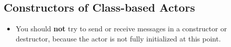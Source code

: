 \subsection{Constructors of Class-based Actors}

\begin{itemize}
\item You should \textbf{not} try to send or receive messages in a constructor or destructor, because the actor is not fully initialized at this point.
\end{itemize}
